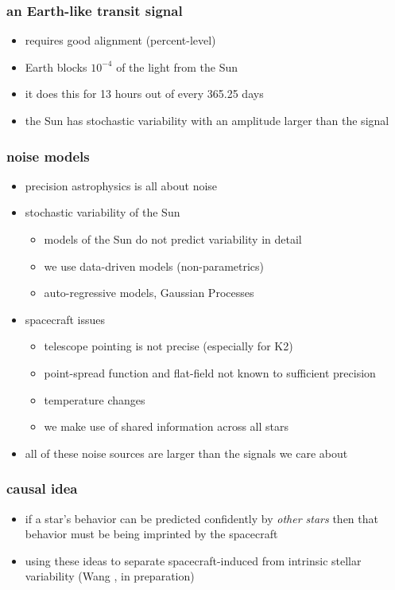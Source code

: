 \documentclass[pdftex]{beamer}
\begin{document}
\begin{frame}
  \frametitle{an Earth-like transit signal}
  \begin{itemize}
  \item requires good alignment (percent-level)
  \item Earth blocks $10^{-4}$ of the light from the Sun
  \item it does this for 13 hours out of every 365.25 days
  \item the Sun has stochastic variability with an amplitude larger than the signal
  \end{itemize}
\end{frame}

\begin{frame}
  \frametitle{noise models}
  \begin{itemize}
  \item precision astrophysics is all about noise
  \item stochastic variability of the Sun
    \begin{itemize}
    \item models of the Sun do not predict variability in detail
    \item we use data-driven models (non-parametrics)
    \item auto-regressive models, Gaussian Processes
    \end{itemize}
  \item spacecraft issues
    \begin{itemize}
    \item telescope pointing is not precise (especially for K2)
    \item point-spread function and flat-field not known to sufficient precision
    \item temperature changes
    \item we make use of shared information across all stars
    \end{itemize}
  \item all of these noise sources are larger than the signals we care about
  \end{itemize}
\end{frame}

\begin{frame}
  \frametitle{causal idea}
  \begin{itemize}
  \item if a star's behavior can be predicted confidently by
    \emph{other stars} then that behavior must be being imprinted by
    the spacecraft
  \item using these ideas to separate spacecraft-induced from
    intrinsic stellar variability (Wang \etal, in preparation)
  \end{itemize}
\end{frame}
\end{document}

